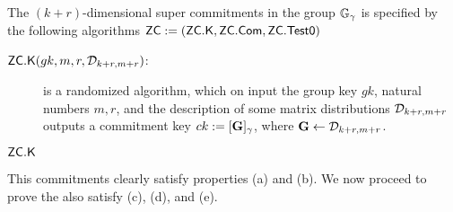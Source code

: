\begin{definition}
The $(k+r)$-dimensional super commitments in the group $\mathbb{G}_\gamma$ is specified by the following algorithms $\mathsf{ZC}:=(\mathsf{ZC}.\mathsf{K},\mathsf{ZC}.\mathsf{Com},\mathsf{ZC}.\mathsf{Test0})$
\begin{description}
\item[$\mathsf{ZC}.\mathsf{K}(gk,m,r,\mathcal{D}_{k+r,m+r})$:] is a randomized algorithm, which on input the group key $gk$, natural numbers $m,r$, and the description of some matrix distributions $\mathcal{D}_{k+r,m+r}$ outputs a commitment key $ck := [\mathbf{{G}}]_\gamma$, where $\mathbf{{G}}\gets\mathcal{D}_{k+r,m+r}$.
\item[$\mathsf{ZC}.\mathsf{K}$]
\end{description}
\end{definition}
This commitments clearly satisfy properties (a) and (b). We now proceed to prove the also satisfy (c), (d), and (e).
